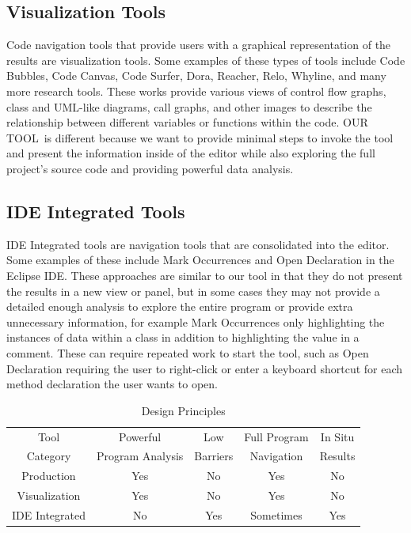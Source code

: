 \documentclass[conference]{IEEEtran}
\newcommand{\toolName}{OUR TOOL}
\begin{document}
\subsection{Visualization Tools}
Code navigation tools that provide users with a graphical representation of the results are visualization tools. Some examples of these types of tools include Code Bubbles\cite{CodeBubbles}, Code Canvas\cite{CodeCanvas}, Code Surfer\cite{CodeSurfer}, Dora\cite{Hill2007Dora}, Reacher\cite{Reacher}, Relo\cite{Relo}, Whyline\cite{WhyLine}, and many more research tools. These works provide various views of control flow graphs, class and UML-like diagrams, call graphs, and other images to describe the relationship between different variables or functions within the code. \toolName~is different because we want to provide minimal steps to invoke the tool and present the information inside of the editor while also exploring the full project's source code and providing powerful data analysis.

\subsection{IDE Integrated Tools}
IDE Integrated tools are navigation tools that are consolidated into the editor. Some examples of these include Mark Occurrences\cite{MarkOccurrences} and Open Declaration in the Eclipse IDE. These approaches are similar to our tool in that they do not present the results in a new view or panel, but in some cases they may not provide a detailed enough analysis to explore the entire program or provide extra unnecessary information, for example Mark Occurrences only highlighting the instances of data within a class in addition to highlighting the value in a comment. These can require repeated work to start the tool, such as Open Declaration requiring the user to right-click or enter a keyboard shortcut for each method declaration the user wants to open.

\begin{table}
	\centering
	\caption{Design Principles}
	\begin{tabular}{|c|c|c|c|c|}
		\hline
		Tool & Powerful & Low & Full Program & In Situ\\
		Category & Program Analysis & Barriers & Navigation & Results\\
		\hline
		Production & Yes & No & Yes & No\\
		\hline
		Visualization & Yes & No & Yes & No \\
		\hline
		IDE Integrated & No & Yes & Sometimes & Yes \\
		\hline
	\end{tabular}
	\label{table:background}
\end{table}
\end{document}
